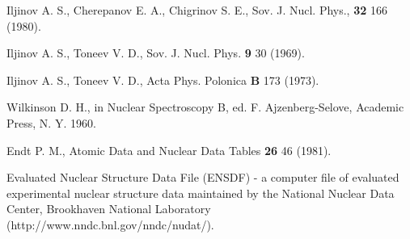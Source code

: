 \begin{thebibliography}{599}
 Iljinov A. S., Cherepanov E. A., Chigrinov S. E.,
Sov. J. Nucl. Phys., {\bf 32} 166 (1980).

 Iljinov A. S., Toneev V. D., Sov. J. Nucl. Phys. {\bf 9} 30
(1969).

 Iljinov A. S., Toneev V. D., Acta Phys. Polonica {\bf B} 173
(1973).

 Wilkinson D. H., in Nuclear Spectroscopy B, 
ed. F. Ajzenberg-Selove, Academic Press, N. Y. 1960.

 Endt P. M., Atomic Data and 
Nuclear Data Tables {\bf 26} 46
(1981).

 Evaluated Nuclear Structure Data File (ENSDF) - a computer file of evaluated
    experimental nuclear structure data maintained by the National Nuclear Data Center,
    Brookhaven National Laboratory 
    (http://www.nndc.bnl.gov/nndc/nudat/). 
\end{thebibliography}
